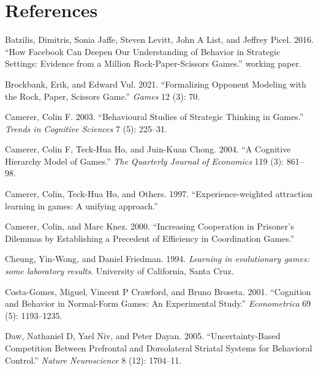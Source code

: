 \documentclass[smallextended]{svjour3}       %
\newlength{\cslhangindent}
\newenvironment{CSLReferences}[2] %
 {%
  \setlength{\parindent}{0pt}
  \ifodd #1 \everypar{\setlength{\hangindent}{\cslhangindent}}\ignorespaces\fi
  \ifnum #2 > 0
  \setlength{\parskip}{#2\baselineskip}
  \fi
 }%
 {}
\begin{document}
\hypertarget{references}{%
\section*{References}\label{references}}

\hypertarget{refs}{}
\begin{CSLReferences}{1}{0}
\leavevmode{}%
Batzilis, Dimitris, Sonia Jaffe, Steven Levitt, John A List, and Jeffrey
Picel. 2016. {``How Facebook Can Deepen Our Understanding of Behavior in
Strategic Settings: Evidence from a Million Rock-Paper-Scissors
Games.''} working paper.

\leavevmode{}%
Brockbank, Erik, and Edward Vul. 2021. {``Formalizing Opponent Modeling
with the Rock, Paper, Scissors Game.''} \emph{Games} 12 (3): 70.

\leavevmode{}%
Camerer, Colin F. 2003. {``Behavioural Studies of Strategic Thinking in
Games.''} \emph{Trends in Cognitive Sciences} 7 (5): 225--31.

\leavevmode{}%
Camerer, Colin F, Teck-Hua Ho, and Juin-Kuan Chong. 2004. {``A Cognitive
Hierarchy Model of Games.''} \emph{The Quarterly Journal of Economics}
119 (3): 861--98.

\leavevmode{}%
Camerer, Colin, Teck-Hua Ho, and Others. 1997. {``{Experience-weighted
attraction learning in games: A unifying approach}.''}

\leavevmode{}%
Camerer, Colin, and Marc Knez. 2000. {``{Increasing Cooperation in
Prisoner's Dilemmas by Establishing a Precedent of Efficiency in
Coordination Games}.''}

\leavevmode{}%
Cheung, Yin-Wong, and Daniel Friedman. 1994. \emph{{Learning in
evolutionary games: some laboratory results}}. University of California,
Santa Cruz.

\leavevmode{}%
Costa-Gomes, Miguel, Vincent P Crawford, and Bruno Broseta. 2001.
{``Cognition and Behavior in Normal-Form Games: An Experimental
Study.''} \emph{Econometrica} 69 (5): 1193--1235.

\leavevmode{}%
Daw, Nathaniel D, Yael Niv, and Peter Dayan. 2005. {``Uncertainty-Based
Competition Between Prefrontal and Dorsolateral Striatal Systems for
Behavioral Control.''} \emph{Nature Neuroscience} 8 (12): 1704--11.


\end{CSLReferences}
\end{document}
